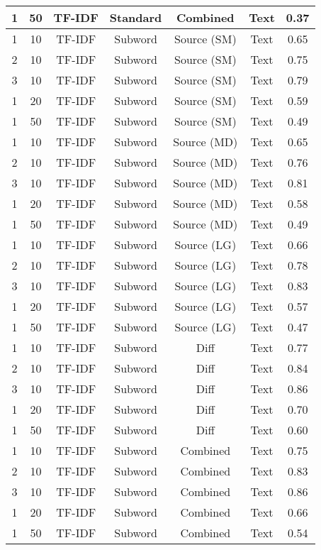\begin{longtable}{|c|c|c|c|c|c|c|}
\hline
1 & 50 & TF-IDF & Standard & Combined & Text & 0.37 \\
\hline
1 & 10 & TF-IDF & Subword & Source (SM) & Text & 0.65 \\
\hline
2 & 10 & TF-IDF & Subword & Source (SM) & Text & 0.75 \\
\hline
3 & 10 & TF-IDF & Subword & Source (SM) & Text & 0.79 \\
\hline
1 & 20 & TF-IDF & Subword & Source (SM) & Text & 0.59 \\
\hline
1 & 50 & TF-IDF & Subword & Source (SM) & Text & 0.49 \\
\hline
1 & 10 & TF-IDF & Subword & Source (MD) & Text & 0.65 \\
\hline
2 & 10 & TF-IDF & Subword & Source (MD) & Text & 0.76 \\
\hline
3 & 10 & TF-IDF & Subword & Source (MD) & Text & 0.81 \\
\hline
1 & 20 & TF-IDF & Subword & Source (MD) & Text & 0.58 \\
\hline
1 & 50 & TF-IDF & Subword & Source (MD) & Text & 0.49 \\
\hline
1 & 10 & TF-IDF & Subword & Source (LG) & Text & 0.66 \\
\hline
2 & 10 & TF-IDF & Subword & Source (LG) & Text & 0.78 \\
\hline
3 & 10 & TF-IDF & Subword & Source (LG) & Text & 0.83 \\
\hline
1 & 20 & TF-IDF & Subword & Source (LG) & Text & 0.57 \\
\hline
1 & 50 & TF-IDF & Subword & Source (LG) & Text & 0.47 \\
\hline
1 & 10 & TF-IDF & Subword & Diff & Text & 0.77 \\
\hline
2 & 10 & TF-IDF & Subword & Diff & Text & 0.84 \\
\hline
3 & 10 & TF-IDF & Subword & Diff & Text & 0.86 \\
\hline
1 & 20 & TF-IDF & Subword & Diff & Text & 0.70 \\
\hline
1 & 50 & TF-IDF & Subword & Diff & Text & 0.60 \\
\hline
1 & 10 & TF-IDF & Subword & Combined & Text & 0.75 \\
\hline
2 & 10 & TF-IDF & Subword & Combined & Text & 0.83 \\
\hline
3 & 10 & TF-IDF & Subword & Combined & Text & 0.86 \\
\hline
1 & 20 & TF-IDF & Subword & Combined & Text & 0.66 \\
\hline
1 & 50 & TF-IDF & Subword & Combined & Text & 0.54 \\

\end{longtable}
